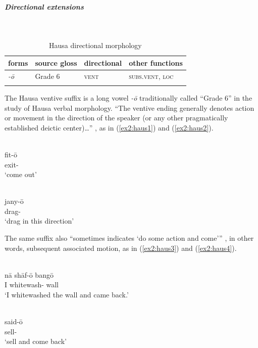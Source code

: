 \subparagraph{Directional extensions}~



\begin{table}[H]
	\caption{Hausa directional morphology}
	\label{tab:haus}
	\begin{tabular}{llll} %
		\lsptoprule
		forms & source gloss & directional  & other functions  \\ %
		\midrule
		\textit{-ō}  & Grade 6  &   \textsc{vent} &  \textsc{subs.vent, loc}  \\
		\lspbottomrule
	\end{tabular}
\end{table} 

The Hausa ventive suffix is a long vowel \textit{-ō} traditionally called ``Grade 6'' in the study of Hausa verbal morphology. ``The ventive ending generally denotes action or movement in the direction of the speaker (or any other pragmatically established deictic center)…'' \citep[663]{newmanHausaLanguageEncyclopedic2000}, as in (\ref{ex2:haus1}) and (\ref{ex2:haus2}).

\ea\label{ex2:haus1}
 \\
\gll fit-ō \\
exit- \\
\glt `come out'

\ex\label{ex2:haus2}
 \\
\gll jany-ō \\
drag- \\
\glt `drag in this direction'
\z 

The same suffix also ``sometimes indicates `do some action and come'{''} \citep[663]{newmanHausaLanguageEncyclopedic2000}, in other words, subsequent associated motion, as in (\ref{ex2:haus3}) and (\ref{ex2:haus4}). 

\ea\label{ex2:haus3}
 \\
\gll nā	shāf-ō	bangō	 \\
I	whitewash-	wall \\
\glt `I whitewashed the wall and came back.'

\ex\label{ex2:haus4}
 \\
\gll said-ō \\ 
sell- \\
\glt `sell and come back'
\z 

